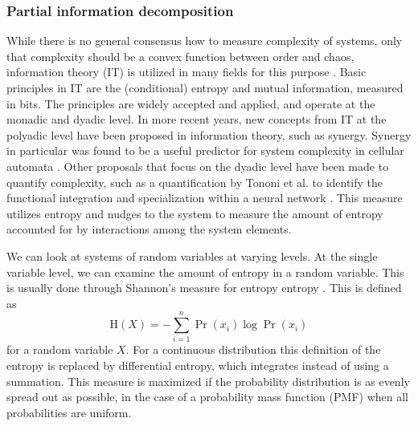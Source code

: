 \documentclass[../main.tex]{subfiles}
\begin{document}
\subsubsection{Partial information decomposition}

While there is no general consensus how to measure complexity of systems, only that complexity should be a convex function between order and chaos, information theory (IT) is utilized in many fields for this purpose \cite{bar2013computationally, williams2010nonnegative}. %
Basic principles in IT are the (conditional) entropy and mutual information, measured in bits.
The principles are widely accepted and applied, and operate at the monadic and dyadic level.
In more recent years, new concepts from IT at the polyadic level have been proposed in information theory, such as synergy.
Synergy in particular was found to be a useful predictor for system complexity in cellular automata \cite{9999QuaxChli}.
Other proposals that focus on the dyadic level have been made to quantify complexity, such as a quantification by Tononi et al. to identify the functional integration and specialization within a neural network \cite{tononi1999measures}.
This measure utilizes entropy and nudges to the system to measure the amount of entropy accounted for by interactions among the system elements.


We can look at systems of random variables at varying levels.
At the single variable level, we can examine the amount of entropy in a random variable.
This is usually done through Shannon's measure for entropy entropy \cite{shannon1949mathematical}.
This is defined as 
%
\begin{equation}
\mathrm{H}\left( X \right) = -\sum^n_{i=1} \Pr \left( x_i \right ) \log \Pr \left( x_i \right)
\end{equation}
%
for a random variable $X$.
For a continuous distribution this definition of the entropy is replaced by differential entropy, which integrates instead of using a summation.
This measure is maximized if the probability distribution is as evenly spread out as possible, in the case of a probability mass function (PMF) when all probabilities are uniform.
\end{document}
